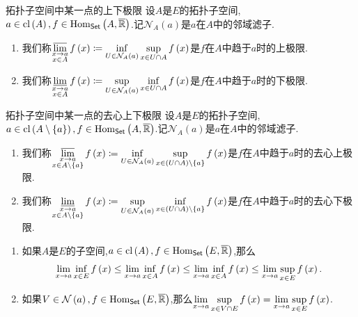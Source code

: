 \begin{definition}{拓扑子空间中某一点的上下极限}{}
	设$A$是$E$的拓扑子空间,$a\in\operatorname{cl}\left(A\right),f\in\operatorname{Hom}_{\mathsf{Set}}\left(A,\overline{\mathbb{R}}\right)$.记$\mathcal{N}_{A}\left(a\right)$是$a$在$A$中的邻域滤子.
	\begin{enumerate}
		\item 我们称$\varlimsup\limits_{\substack{x\to a\\ x\in A}}f\left(x\right)\coloneq\inf\limits_{U\in\mathcal{N}_{A}\left(a\right)}\sup\limits_{x\in U\cap A}f\left(x\right)$是$f$在$A$中趋于$a$时的上极限.
		\item 我们称$\varliminf\limits_{\substack{x\to a\\ x\in A}}f\left(x\right)\coloneq\sup\limits_{U\in\mathcal{N}_{A}\left(a\right)}\inf\limits_{x\in U\cap A}f\left(x\right)$是$f$在$A$中趋于$a$时的下极限.
	\end{enumerate}
\end{definition}

\begin{definition}{拓扑子空间中某一点的去心上下极限}{}
	设$A$是$E$的拓扑子空间,$a\in\operatorname{cl}\left(A\setminus\left\{a\right\}\right),f\in\operatorname{Hom}_{\mathsf{Set}}\left(A,\overline{\mathbb{R}}\right)$.记$\mathcal{N}_{A}\left(a\right)$是$a$在$A$中的邻域滤子.
	\begin{enumerate}
		\item 我们称$\varlimsup\limits_{\substack{x\to a\\ x\in A\setminus\left\{a\right\}}}f\left(x\right)\coloneq\inf\limits_{U\in\mathcal{N}_{A}\left(a\right)}\sup\limits_{x\in(U\cap A)\setminus\left\{a\right\}}f\left(x\right)$是$f$在$A$中趋于$a$时的去心上极限.
		\item 我们称$\varliminf\limits_{\substack{x\to a\\ x\in A\setminus\left\{a\right\}}}f\left(x\right)\coloneq\sup\limits_{U\in\mathcal{N}_{A}\left(a\right)}\inf\limits_{x\in(U\cap A)\setminus\left\{a\right\}}f\left(x\right)$是$f$在$A$中趋于$a$时的去心下极限.
	\end{enumerate}
\end{definition}

\begin{remark}{}{}
	\begin{enumerate}
		\item 如果$A$是$E$的子空间,$a\in\operatorname{cl}\left(A\right),f\in\operatorname{Hom}_{\mathsf{Set}}\left(E,\overline{\mathbb{R}}\right)$,那么
		\begin{align*}
			\displaystyle\lim_{x\to a}\inf\limits_{x\in E}f\left(x\right)\leq\displaystyle\lim_{x\to a}\inf\limits_{x\in A}f\left(x\right)\leq\displaystyle\lim_{x\to a}\inf\limits_{x\in A}f\left(x\right)\leq\displaystyle\lim_{x\to a}\sup\limits_{x\in E}f\left(x\right).
		\end{align*}
		\item 如果$V\in\mathcal{N}\left(a\right),f\in\operatorname{Hom}_{\mathsf{Set}}\left(E,\overline{\mathbb{R}}\right)$,那么$\displaystyle\lim_{x\to a}\sup\limits_{x\in V\cap E}f\left(x\right)=\displaystyle\lim_{x\to a}\sup\limits_{x\in E}f\left(x\right)$.
	\end{enumerate}
\end{remark}

